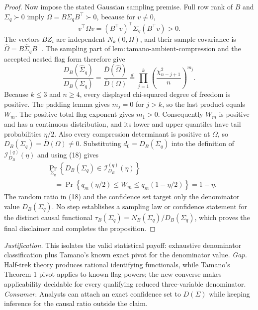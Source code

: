\documentclass{article}
\begin{document}
\begin{proof}
Now impose the stated Gaussian sampling premise.  Full row rank of
\(B\) and \(\Sigma_q\succ0\) imply
\(\Omega=B\Sigma_qB^{\top}\succ0\), because for \(v\neq0\),
\[
 v^{\top}\Omega v=(B^{\top}v)^{\top}\Sigma_q(B^{\top}v)>0.
\]
The vectors \(BZ_i\) are independent \(N_k(0,\Omega)\), and their
sample covariance is
\(\widehat\Omega=B\widehat\Sigma_qB^{\top}\).  The sampling part of
\(\mathrm{lem{:}tamano\text{-}ambient\text{-}compression}\) and the
accepted nested flag form therefore give
\[
 \frac{D_B(\widehat\Sigma_q)}{D_B(\Sigma_q)}
 =\frac{\bar D(\widehat\Omega)}{\bar D(\Omega)}
 \stackrel{d}{=}
 \prod_{j=1}^{k}
 \left(\frac{\chi^2_{n-j+1}}{n}\right)^{m_j}.                       \tag{18}
\]
Because \(k\leq3\) and \(n\geq4\), every displayed chi-squared degree
of freedom is positive.  The padding lemma gives \(m_j=0\) for
\(j>k\), so the last product equals \(W_m\).  The positive total flag
exponent gives \(m_1>0\).  Consequently \(W_m\) is positive and has a
continuous distribution, and its lower and upper quantiles have tail
probabilities \(\eta/2\).  Also every compression determinant is
positive at \(\Omega\), so \(D_B(\Sigma_q)=\bar D(\Omega)\neq0\).
Substituting \(d_0=D_B(\Sigma_q)\) into the definition of
\(\mathcal I_{D_B}^{(q)}(\eta)\) and using (18) gives
\[
 \begin{aligned}
 &\Pr_{\Sigma_q}\!\left\{D_B(\Sigma_q)
       \in\mathcal I_{D_B}^{(q)}(\eta)\right\} \\
 &\quad=\Pr\!\left\{q_m(\eta/2)\leq W_m
       \leq q_m(1-\eta/2)\right\}=1-\eta.
 \end{aligned}
\]
The random ratio in (18) and the confidence set target only the
denominator value \(D_B(\Sigma_q)\).  No step establishes a sampling
law or confidence statement for the distinct causal functional
\(\tau_B(\Sigma_q)=N_B(\Sigma_q)/D_B(\Sigma_q)\), which proves the final
disclaimer and completes the proposition.
\end{proof}
\par\smallskip\noindent \textit{Justification.} This isolates the valid statistical payoff: exhaustive denominator classification plus Tamano's known exact pivot for the denominator value. \textit{Gap.} Half-trek theory produces rational identifying functionals, while Tamano's Theorem 1 pivot applies to known flag powers; the new converse makes applicability decidable for every qualifying reduced three-variable denominator. \textit{Consumer.} Analysts can attach an exact confidence set to \(D(\Sigma)\) while keeping inference for the causal ratio outside the claim.
\end{document}
